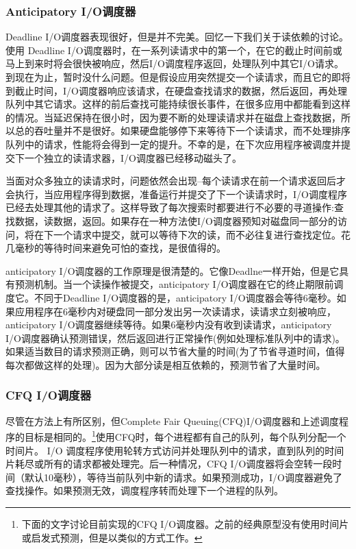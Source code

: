 \subsubsection{Anticipatory I/O调度器}

Deadline I/O调度器表现很好，但是并不完美。回忆一下我们关于读依赖的讨论。使用 Deadline I/O调度器时，在一系列读请求中的第一个，在它的截止时间前或马上到来时将会很快被响应，然后I/O调度程序返回，处理队列中其它I/O请求。到现在为止，暂时没什么问题。但是假设应用突然提交一个读请求，而且它的即将到截止时间，I/O调度器响应该请求，在硬盘查找请求的数据，然后返回，再处理队列中其它请求。这样的前后查找可能持续很长事件，在很多应用中都能看到这样的情况。当延迟保持在很小时，因为要不断的处理读请求并在磁盘上查找数据，所以总的吞吐量并不是很好。如果硬盘能够停下来等待下一个读请求，而不处理排序队列中的请求，性能将会得到一定的提升。不幸的是，在下次应用程序被调度并提交下一个独立的读请求器，I/O调度器已经移动磁头了。
     
当面对众多独立的读请求时，问题依然会出现--每个读请求在前一个请求返回后才会执行，当应用程序得到数据，准备运行并提交了下一个读请求时，I/O调度程序已经去处理其他的请求了。这样导致了每次搜索时都要进行不必要的寻道操作:查找数据，读数据，返回。如果存在一种方法使I/O调度器预知对磁盘同一部分的访问，将在下一个请求中提交，就可以等待下次的读，而不必往复进行查找定位。花几毫秒的等待时间来避免可怕的查找，是很值得的。
     
anticipatory I/O调度器的工作原理是很清楚的。它像Deadlne一样开始，但是它具有预测机制。当一个读操作被提交，anticipatory I/O调度器在它的终止期限前调度它。不同于Deadline I/O调度器的是，anticipatory I/O调度器会等待6毫秒。如果应用程序在6毫秒内对硬盘同一部分发出另一次读请求，读请求立刻被响应，anticipatory I/O调度器继续等待。如果6毫秒内没有收到读请求，anticipatory I/O调度器确认预测错误，然后返回进行正常操作(例如处理标准队列中的请求)。如果适当数目的请求预测正确，则可以节省大量的时间(为了节省寻道时间，值得每次都做这样的处理)。因为大部分读是相互依赖的，预测节省了大量时间。

\subsubsection{CFQ I/O调度器}

尽管在方法上有所区别，但Complete Fair Queuing(CFQ)I/O调度器和上述调度程序的目标是相同的。\footnote[1]{下面的文字讨论目前实现的CFQ I/O调度器。之前的经典原型没有使用时间片或启发式预测，但是以类似的方式工作。}使用CFQ时，每个进程都有自己的队列，每个队列分配一个时间片。 I/O 调度程序使用轮转方式访问并处理队列中的请求，直到队列的时间片耗尽或所有的请求都被处理完。后一种情况，CFQ I/O调度器将会空转一段时间（默认10毫秒），等待当前队列中新的请求。如果预测成功，I/O调度器避免了查找操作。如果预测无效，调度程序转而处理下一个进程的队列。

